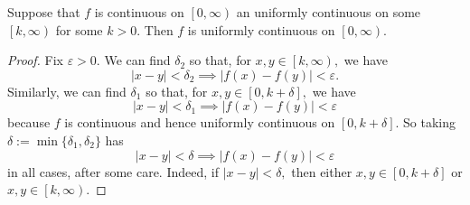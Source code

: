 \documentclass[../notes.tex]{subfiles}
\begin{document}
\begin{exercise}
	Suppose that $f$ is continuous on $\left[0,\infty\right)$ an uniformly continuous on some $\left[k,\infty\right)$ for some $k>0.$ Then $f$ is uniformly continuous on $\left[0,\infty\right).$
\end{exercise}
\begin{proof}
	Fix $\varepsilon>0.$ We can find $\delta_2$ so that, for $x,y\in\left[k,\infty\right),$ we have
	\[|x-y|<\delta_2\implies|f(x)-f(y)|<\varepsilon.\]
	Similarly, we can find $\delta_1$ so that, for $x,y\in[0,k+\delta],$ we have
	\[|x-y|<\delta_1\implies|f(x)-f(y)|<\varepsilon\]
	because $f$ is continuous and hence uniformly continuous on $[0,k+\delta].$ So taking $\delta:=\min\{\delta_1,\delta_2\}$ has
	\[|x-y|<\delta\implies|f(x)-f(y)|<\varepsilon\]
	in all cases, after some care. Indeed, if $|x-y|<\delta,$ then either $x,y\in[0,k+\delta]$ or $x,y\in\left[k,\infty\right).$
\end{proof}
\end{document}
